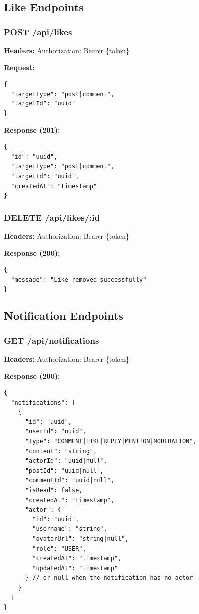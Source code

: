 \documentclass[11pt,a4paper]{article}
\begin{document}
\subsection{Like Endpoints}

\subsubsection{POST /api/likes}
\textbf{Headers:} Authorization: Bearer \{token\}

\textbf{Request:}
\begin{lstlisting}
{
  "targetType": "post|comment",
  "targetId": "uuid"
}
\end{lstlisting}

\textbf{Response (201):}
\begin{lstlisting}
{
  "id": "uuid",
  "targetType": "post|comment",
  "targetId": "uuid",
  "createdAt": "timestamp"
}
\end{lstlisting}

\subsubsection{DELETE /api/likes/:id}
\textbf{Headers:} Authorization: Bearer \{token\}

\textbf{Response (200):}
\begin{lstlisting}
{
  "message": "Like removed successfully"
}
\end{lstlisting}

\subsection{Notification Endpoints}

\subsubsection{GET /api/notifications}
\textbf{Headers:} Authorization: Bearer \{token\}

\textbf{Response (200):}
\begin{lstlisting}
{
  "notifications": [
    {
      "id": "uuid",
      "userId": "uuid",
      "type": "COMMENT|LIKE|REPLY|MENTION|MODERATION",
      "content": "string",
      "actorId": "uuid|null",
      "postId": "uuid|null",
      "commentId": "uuid|null",
      "isRead": false,
      "createdAt": "timestamp",
      "actor": {
        "id": "uuid",
        "username": "string",
        "avatarUrl": "string|null",
        "role": "USER",
        "createdAt": "timestamp",
        "updatedAt": "timestamp"
      } // or null when the notification has no actor
    }
  ]
}
\end{lstlisting}
\end{document}
